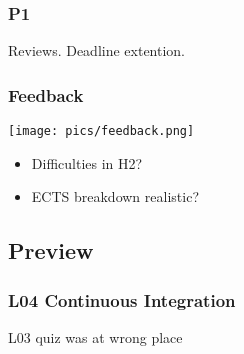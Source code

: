 \begin{assignment}
	\frametitle{P1}

	\begin{task}
	Reviews. Deadline extention.
	\end{task}
\end{assignment}

\begin{frame}
	\frametitle{Feedback}

	\hfill \texttt{[image: pics/feedback.png]}
	\vspace{-1cm}
	\begin{itemize}
		\item Difficulties in H2?
		\item ECTS breakdown realistic?
	\end{itemize}
\end{frame}

\subsection{Preview}

\begin{frame}
	\frametitle{L04 Continuous Integration}

	L03 quiz was at wrong place
\end{frame}



